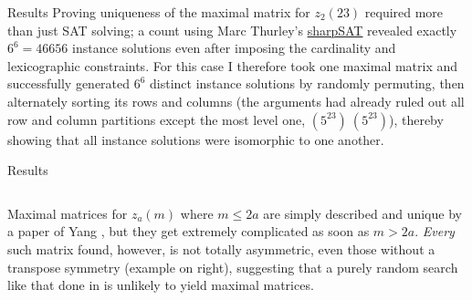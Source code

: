 \documentclass[10pt]{beamer}
\begin{document}
\begin{frame}{Results}
    Proving uniqueness of the maximal matrix for $z_2(23)$ required more than just SAT solving; a count using Marc Thurley's \href{https://github.com/marcthurley/sharpSAT}{sharpSAT} revealed exactly $6^6=46656$ instance solutions even after imposing the cardinality and lexicographic constraints. For this case I therefore took one maximal matrix and successfully generated $6^6$ distinct instance solutions by randomly permuting, then alternately sorting its rows and columns (the arguments had already ruled out all row and column partitions except the most level one, $(5^{23})\ (5^{23})$), thereby showing that all instance solutions were isomorphic to one another.
\end{frame}

\begin{frame}{Results}
    \begin{columns}[T,onlytextwidth]
      Maximal matrices for $z_a(m)$ where $m\le2a$ are simply described and unique by a paper of Yang \cite{yang}, but they get extremely complicated as soon as $m>2a$. \textit{Every} such matrix found, however, is not totally asymmetric, even those without a transpose symmetry (example on right), suggesting that a purely random search like that done in \cite{collins} is unlikely to yield maximal matrices.

\end{columns}
\end{frame}
\end{document}
